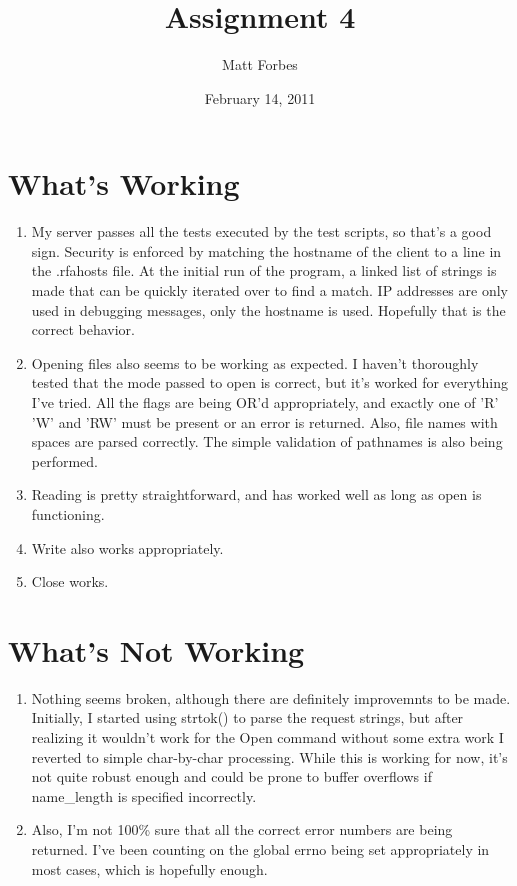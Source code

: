 \documentclass[a4paper,12pt]{article}
\begin{document}
\title{Assignment 4}
\author{Matt Forbes}
\date{February 14, 2011}
\maketitle

\section*{What's Working}
\begin{enumerate}[]
  \item My server passes all the tests executed by the test scripts,
    so that's a good sign. Security is enforced by matching the
    hostname of the client to a line in the .rfahosts file. At the
    initial run of the program, a linked list of strings is made that
    can be quickly iterated over to find a match. IP addresses are
    only used in debugging messages, only the hostname is
    used. Hopefully that is the correct behavior.
    
  \item Opening files also seems to be working as expected. I haven't
    thoroughly tested that the mode passed to open is correct, but
    it's worked for everything I've tried. All the flags are being
    OR'd appropriately, and exactly one of 'R' 'W' and 'RW' must be
    present or an error is returned. Also, file names with spaces are
    parsed correctly. The simple validation of pathnames is also being
    performed.

  \item Reading is pretty straightforward, and has worked well as long
    as open is functioning.

  \item Write also works appropriately.
    
  \item Close works.
\end{enumerate}

\section*{What's Not Working}
\begin{enumerate}[]
  \item Nothing seems broken, although there are definitely
    improvemnts to be made. Initially, I started using strtok() to
    parse the request strings, but after realizing it wouldn't work
    for the Open command without some extra work I reverted to simple
    char-by-char processing. While this is working for now, it's not
    quite robust enough and could be prone to buffer overflows if
    name_length is specified incorrectly. 
    
  \item Also, I'm not 100\% sure that all the correct error numbers
    are being returned. I've been counting on the global errno being
    set appropriately in most cases, which is hopefully enough.
\end{enumerate}
\end{document}
